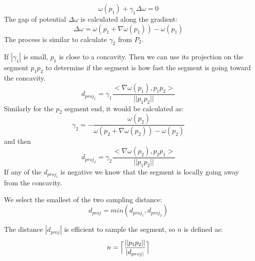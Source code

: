 \documentclass[11pt,a4paper]{article}
\begin{document}

\begin{equation}
\omega (p_1) + \gamma_1 \Delta \omega = 0
\end{equation}
The gap of potential $\Delta \omega$ is calculated along the gradient:
\begin{equation}
\Delta \omega  = \omega (p_1 + \nabla \omega (p_1)) - \omega (p_1)
\end{equation}
The process is similar to calculate $\gamma_2$ from $P_2$.


If $|\gamma_1|$ is small, $p_1$ is close to a concavity. 
Then we can use its projection on the segment $p_1p_2$ to determine if the segment is how fast the segment is going toward the concavity.
\begin{equation}
 d_{proj_1} = \gamma_1 \frac{<\nabla \omega(p_1), p_1p_2>}{||p_1p_2||} 
\end{equation}
Similarly for the $p_2$ segment end, it would be calculated  as:
\begin{equation}
\gamma_2 = - \frac{\omega(p_2)}{\omega( p_2 + \nabla \omega(p_2)) -\omega(p_2)} 
\end{equation}
and then
\begin{equation}
 d_{proj_2} = \gamma_2 \frac{<\nabla \omega(p_2), p_2p_1>}{||p_1p_2||}
\end{equation}
If any of the $d_{proj_i}$ is negative we know that the segment is locally going away from the concavity.

We select the smallest of the two sampling distance:
\begin{equation}
d_{proj} = min(d_{proj_1}, d_{proj_2})
\end{equation}

The distance $|d_{proj}|$ is efficient to sample the segment, so $n$ is defined as:
\begin{equation}
n = \Bigl\lceil\frac{||p_1p_2||}{|d_{proj|}}\Bigr\rceil
\end{equation}
\end{document}
